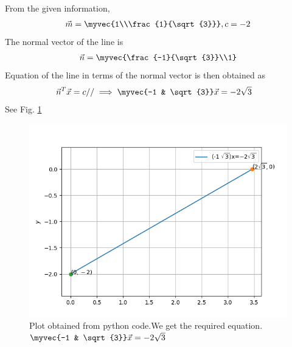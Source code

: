 
From the given information,
\begin{align}
\vec{m}=\myvec{1\\\frac{1}{\sqrt{3}}},c=-2
\end{align}
The normal vector of the line is
\begin{align}
\vec{n}=\myvec{\frac{-1}{\sqrt{3}}\\1}
\end{align}
Equation of the line in terms of the normal vector is then obtained as
\begin{align}
\vec{n}^{T}\vec{x}&=c
//
\implies \myvec{-1 & \sqrt{3}}\vec{x}=-2\sqrt{3}\label{5/3/fe}
\end{align}
See Fig.         \ref{5/3/fig:Line} 
\begin{figure}[ht!]
       \centering
        \includegraphics[width =\columnwidth]{fig2.1.png}
        \caption{Plot obtained from python code.We get the required equation.$\myvec{-1 & \sqrt{3}}\vec{x}=-2\sqrt{3}$}
        \label{5/3/fig:Line}
\end{figure}


